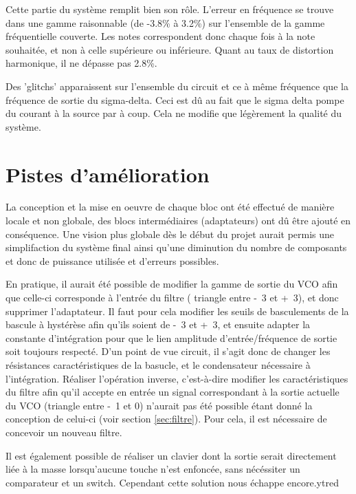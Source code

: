 Cette partie du système remplit bien son rôle. L'erreur en 
fréquence se trouve dans une gamme raisonnable (de -3.8\% à 3.2\%)
sur l'ensemble de la gamme fréquentielle couverte. Les notes 
correspondent donc chaque fois à la note souhaitée, et non à celle
supérieure ou inférieure.
Quant au taux de distortion harmonique, il ne dépasse pas 2.8\%.

Des 'glitchs' apparaissent sur l'ensemble du circuit et ce à 
même fréquence que la fréquence de sortie du sigma-delta. Ceci est dû au fait que
le sigma delta pompe du courant à la source par à coup. Cela ne modifie
que légèrement la qualité du système.

\section{Pistes d'amélioration}
\label{sec:pistes-amelioration}
La conception et la mise en oeuvre de chaque bloc ont été effectué
de manière locale et non globale, des blocs
intermédiaires (adaptateurs) ont dû être ajouté en conséquence. Une vision plus
globale dès le début du projet aurait permis une simplifaction du
système final ainsi qu'une diminution du nombre de composants et
donc de puissance utilisée et d'erreurs possibles.

En pratique, il aurait été possible de modifier la gamme de sortie
du VCO afin que celle-ci corresponde à l'entrée du filtre (
triangle entre \unit{-3}{\volt} et \unit{+3}{\volt}), et donc 
supprimer l'adaptateur. Il faut pour cela modifier les seuils
de basculements de la bascule à hystérèse afin qu'ils soient de
\unit{-3}{\volt} et \unit{+3}{\volt}, et ensuite adapter la
constante d'intégration pour que le lien amplitude d'entrée/fréquence
de sortie soit toujours respecté. D'un point de vue circuit, il s'agit
donc de changer les résistances caractéristiques de la basucle, et le
condensateur nécessaire à l'intégration. Réaliser l'opération inverse,
c'est-à-dire modifier les caractéristiques du filtre afin qu'il accepte
en entrée un signal correspondant à la sortie actuelle du VCO 
(triangle entre \unit{-1}{\volt} et \unit{0}{\volt}) n'aurait pas été 
possible étant donné la conception de celui-ci (voir section \ref{sec:filtre}). 
Pour cela, il est nécessaire de concevoir un nouveau filtre.

Il est également possible de réaliser un clavier dont la sortie serait directement
liée à la masse lorsqu'aucune touche n'est enfoncée, sans nécéssiter un comparateur
et un switch. Cependant cette solution nous échappe encore.ytred

